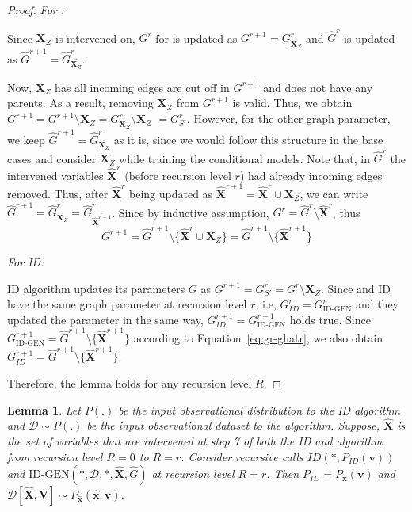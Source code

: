 \documentclass{article}
\newcommand{\X}{\mathbf{X}}
\newcommand{\Xp}{{\hat{\mathbf{X}}}}
\newcommand{\xp}{{\hat{\mathbf{x}}}}
\newcommand{\Gp}{{\hat{{G}}}}
\newcommand{\V}{\mathbf{V}}
\newcommand{\vb}{\mathbf{v}}
\newcommand{\data}{\mathcal{D}}
\newcommand{\idgen}{\text{ID-GEN}\xspace}
\theoremstyle{plain}
\newtheorem{lemma}[theorem]{Lemma}
\theoremstyle{definition}
\theoremstyle{remark}
\begin{document}
\begin{proof}
  \emph{For \idgen:}
  
		Since $\X_Z$ is intervened on, $G^r$ for \idgen is updated as $G^{r+1} = G^{r}_{\overline{\X_Z}}$ and
		$\Gp^r$ is updated as $\Gp^{r+1} = \Gp^{r}_{\overline{\X_Z}}$.
		
		Now, $\X_Z$ has all incoming edges are cut off in 
		$G^{r+1}$
		and does not have any parents.
		As a result, removing $\X_Z$ from $G^{r+1}$
		is valid. Thus, we obtain $G^{r+1} = G^{r+1} \setminus {\X_Z} 
		= G^{r}_{\overline{\X_Z}} \setminus {\X_Z} $
		$=G^r_{S'}$.
		However,  for the other graph parameter, we keep $\Gp^{r+1} = \Gp^{r}_{\overline{\X_Z}}$ as it is, since we would follow this structure in the base cases and consider $\X_Z$ while training the conditional models. 
  Note that, in $\Gp^{r}$ the intervened variables $\Xp^r$ (before recursion level $r$) had already incoming edges removed. Thus, after $\Xp^{r}$ being updated as $\Xp^{r+1} = \Xp^r \cup \X_Z$, we can write $\Gp^{r+1} = \Gp^{r}_{\overline{\X_Z}} = \Gp^{r}_{\overline{\Xp^{r+1}}}$.
		Since by inductive assumption, $G^{r} = \Gp^{r} \setminus \Xp^r$, thus
  \begin{equation}
  \label{eq:gr-ghatr}
      G^{r+1} = \Gp^{r+1} \setminus \{\Xp^r\cup \X_Z\}= \Gp^{r+1} \setminus \{\Xp^{r+1}\}
  \end{equation}

    \emph{For ID:}
    
ID algorithm updates its parameters $G$ as 
$G^{r+1} = 
G^r_{S'}=
G^r\setminus \X_Z$.
		Since \idgen and ID have the same graph parameter at recursion level $r$, i.e, $G^{r}_{ID}= G^{r}_{\idgen}$ and they updated the parameter in the same way, $G^{r+1}_{ID}=G^{r+1}_{\idgen}$ holds true.
		Since $G^{r+1}_{\idgen} = \Gp^{r+1} \setminus \{\Xp^{r+1}\}$ according to Equation~\ref{eq:gr-ghatr}, 
  we also obtain $G^{r+1}_{ID} = \Gp^{r+1} \setminus \{\Xp^{r+1}\}$.
		
		Therefore, the lemma holds for any recursion level $R$.
	\end{proof}
	
	
	
	
	\begin{lemma}
		\label{lem:same-dist-dist}
		Let $P(.)$ be the input observational distribution to the ID algorithm and $\data \sim P(.)$ be the input observational dataset to the \idgen algorithm. 
		Suppose, $\Xp$ is the set of variables that are intervened at step 7 of both the ID and \idgen algorithm from recursion level $R=0$ to $R=r$.
		Consider recursive calls  $ID(*, P_{ID}(\vb))$ and  $\idgen(*, \data, *,  \Xp, \Gp )$ at recursion level $R=r$.
		Then $P_{ID} = P_{\xp}(\vb)$ and $\data[\Xp, \V] \sim P_{\xp}(\xp, \vb)$.
	\end{lemma}
	
\end{document}
